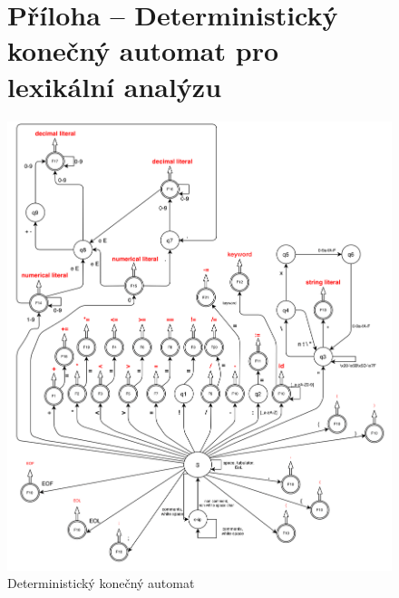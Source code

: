 \documentclass[12pt]{article}
\begin{document}
    \newpage

\renewcommand{\refname}{\section{Literatura}}

\newpage
    \begin{figure}
    \section{Příloha -- Deterministický konečný automat pro lexikální analýzu}
        \begin{center}
            \includegraphics[scale=0.26]{scannerDKAfinalversion1.0-1.png}
            \caption{Deterministický konečný automat}
            \label{DKA}
        \end{center}
    \end{figure}
    \newpage
\end{document}

